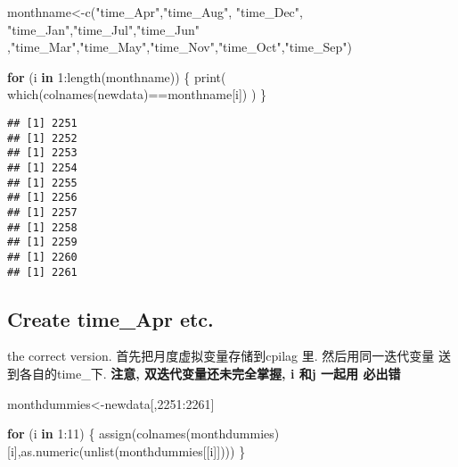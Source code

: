 \documentclass[
]{article}
\newenvironment{Shaded}{\begin{snugshade}}{\end{snugshade}}
\newcommand{\ControlFlowTok}[1]{\textcolor[rgb]{0.13,0.29,0.53}{\textbf{#1}}}
\newcommand{\DecValTok}[1]{\textcolor[rgb]{0.00,0.00,0.81}{#1}}
\newcommand{\FunctionTok}[1]{\textcolor[rgb]{0.00,0.00,0.00}{#1}}
\newcommand{\NormalTok}[1]{#1}
\newcommand{\OtherTok}[1]{\textcolor[rgb]{0.56,0.35,0.01}{#1}}
\newcommand{\SpecialCharTok}[1]{\textcolor[rgb]{0.00,0.00,0.00}{#1}}
\newcommand{\StringTok}[1]{\textcolor[rgb]{0.31,0.60,0.02}{#1}}
\begin{document}
\begin{Shaded}
\begin{Highlighting}[]
\NormalTok{monthname}\OtherTok{\textless{}{-}}\FunctionTok{c}\NormalTok{(}\StringTok{"time\_Apr"}\NormalTok{,}\StringTok{"time\_Aug"}\NormalTok{, }\StringTok{"time\_Dec"}\NormalTok{,  }\StringTok{"time\_Jan"}\NormalTok{,}\StringTok{"time\_Jul"}\NormalTok{,}\StringTok{"time\_Jun"}\NormalTok{ ,}\StringTok{"time\_Mar"}\NormalTok{,}\StringTok{"time\_May"}\NormalTok{,}\StringTok{"time\_Nov"}\NormalTok{,}\StringTok{"time\_Oct"}\NormalTok{,}\StringTok{"time\_Sep"}\NormalTok{)}

\ControlFlowTok{for}\NormalTok{ (i }\ControlFlowTok{in} \DecValTok{1}\SpecialCharTok{:}\FunctionTok{length}\NormalTok{(monthname)) \{}
  \FunctionTok{print}\NormalTok{(}
 \FunctionTok{which}\NormalTok{(}\FunctionTok{colnames}\NormalTok{(newdata)}\SpecialCharTok{==}\NormalTok{monthname[i])}
\NormalTok{)}
\NormalTok{\}}
\end{Highlighting}
\end{Shaded}

\begin{verbatim}
## [1] 2251
## [1] 2252
## [1] 2253
## [1] 2254
## [1] 2255
## [1] 2256
## [1] 2257
## [1] 2258
## [1] 2259
## [1] 2260
## [1] 2261
\end{verbatim}

\hypertarget{create-time_apr-etc.}{%
\subsection{Create time\_Apr etc.}\label{create-time_apr-etc.}}

the correct version. 首先把月度虚拟变量存储到cpilag 里.
然后用同一迭代变量 送到各自的time\_下. \textbf{注意,
双迭代变量还未完全掌握, i 和j 一起用 必出错}

\begin{Shaded}
\begin{Highlighting}[]
\NormalTok{monthdummies}\OtherTok{\textless{}{-}}\NormalTok{newdata[,}\DecValTok{2251}\SpecialCharTok{:}\DecValTok{2261}\NormalTok{]}

  \ControlFlowTok{for}\NormalTok{ (i }\ControlFlowTok{in} \DecValTok{1}\SpecialCharTok{:}\DecValTok{11}\NormalTok{) \{}
  \FunctionTok{assign}\NormalTok{(}\FunctionTok{colnames}\NormalTok{(monthdummies)[i],}\FunctionTok{as.numeric}\NormalTok{(}\FunctionTok{unlist}\NormalTok{(monthdummies[[i]])))}
\NormalTok{  \}}
\end{Highlighting}
\end{Shaded}
\end{document}
